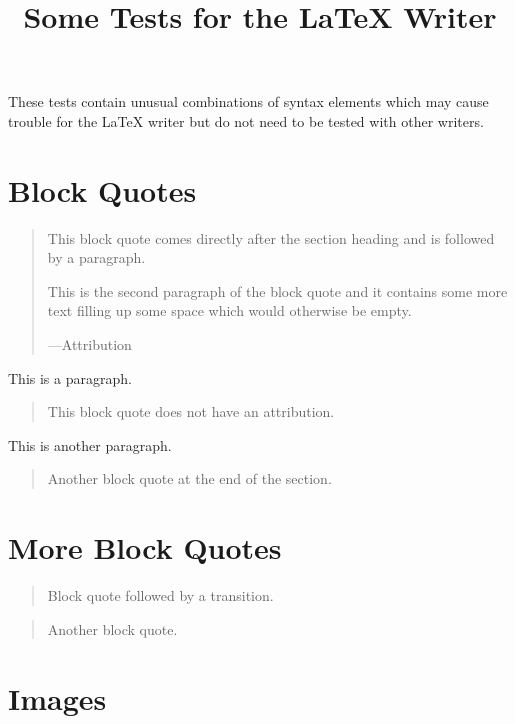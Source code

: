 \documentclass[a4paper]{article}
\providecommand*{\DUtransition}{%
  \hspace*{\fill}\hrulefill\hspace*{\fill}
  \vskip 0.5\baselineskip
}
\begin{document}
\title{Some Tests for the LaTeX Writer%
  \label{some-tests-for-the-latex-writer}}
\author{}
\date{}
\maketitle

These tests contain unusual combinations of syntax elements which may cause
trouble for the LaTeX writer but do not need to be tested with other writers.


\section{Block Quotes%
  \label{block-quotes}%
}

\begin{quote}
This block quote comes directly after the section heading and is
followed by a paragraph.

This is the second paragraph of the block quote and it contains
some more text filling up some space which would otherwise be
empty.
\nopagebreak

\raggedleft —Attribution
\end{quote}

This is a paragraph.

\begin{quote}
This block quote does not have an attribution.
\end{quote}

This is another paragraph.

\begin{quote}
Another block quote at the end of the section.
\end{quote}


\section{More Block Quotes%
  \label{more-block-quotes}%
}

\begin{quote}
Block quote followed by a transition.
\end{quote}

\DUtransition

\begin{quote}
Another block quote.
\end{quote}


\section{Images%
  \label{images}%
}
\end{document}
